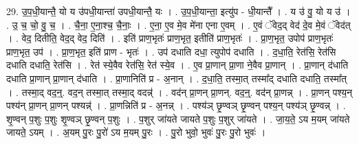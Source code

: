 \documentclass[17pt]{extarticle}
\begin{document}
29. उ॒प॒धी॒यान्तै॒ यो य उ॑पधी॒यान्ता॑ उपधी॒यान्तै॒ यः । . उ॒प॒धी॒यान्ता॒ इत्यु॑प - धी॒यान्तै᳚ । . य उ॑ वु॒ यो य उ॑ । . उ॒ च॒ चो॒ वु॒ च॒ । . चै॒ना॒ ए॒ना॒श्च॒ चै॒नाः॒ । . ए॒ना॒ ए॒व मे॒व मे॑ना एना ए॒वम् । . ए॒वं ॅवेद॒द् वेद॑ दे॒व मे॒वं ॅवेद॑त् । . वेद॒ दितीति॒ वेद॒द् वेद॒ दिति॑ । . इति॑ प्राण॒भृतः॑ प्राण॒भृत॒ इतीति॑ प्राण॒भृतः॑ । . प्रा॒ण॒भृत॒ उपोप॑ प्राण॒भृतः॑ प्राण॒भृत॒ उप॑ । . प्रा॒ण॒भृत॒ इति॑ प्राण - भृतः॑ । . उप॑ दधाति दधा॒ त्युपोप॑ दधाति । . द॒धा॒ति॒ रेत॑सि॒ रेत॑सि दधाति दधाति॒ रेत॑सि । . रेत॑ स्ये॒वैव रेत॑सि॒ रेत॑ स्ये॒व । . ए॒व प्रा॒णान् प्रा॒णा ने॒वैव प्रा॒णान् । . प्रा॒णान् द॑धाति दधाति प्रा॒णान् प्रा॒णान् द॑धाति । . प्रा॒णानिति॑ प्र - अ॒नान् । . द॒धा॒ति॒ तस्मा॒त् तस्मा᳚द् दधाति दधाति॒ तस्मा᳚त् । . तस्मा॒द् वद॒न्॒. वद॒न् तस्मा॒त् तस्मा॒द् वदन्न्॑ । . वद॑न् प्रा॒णन् प्रा॒णन्. वद॒न्॒. वद॑न् प्रा॒णन्न् । . प्रा॒णन् पश्य॒न् पश्य॑न् प्रा॒णन् प्रा॒णन् पश्यन्न्॑ । . प्रा॒णन्निति॑ प्र - अ॒नन्न् । . पश्य॑ञ् छृ॒ण्वञ् छृ॒ण्वन् पश्य॒न् पश्य॑ञ् छृ॒ण्वन्न् । . शृ॒ण्वन् प॒शुः प॒शुः शृ॒ण्वञ् छृ॒ण्वन् प॒शुः । . प॒शुर् जा॑यते जायते प॒शुः प॒शुर् जा॑यते । . जा॒य॒ते॒ ऽय म॒यम् जा॑यते जायते॒ ऽयम् । . अ॒यम् पु॒रः पु॒रो॑ ऽय म॒यम् पु॒रः । . पु॒रो भुवो॒ भुवः॑ पु॒रः पु॒रो भुवः॑ । \newline
\end{document}
